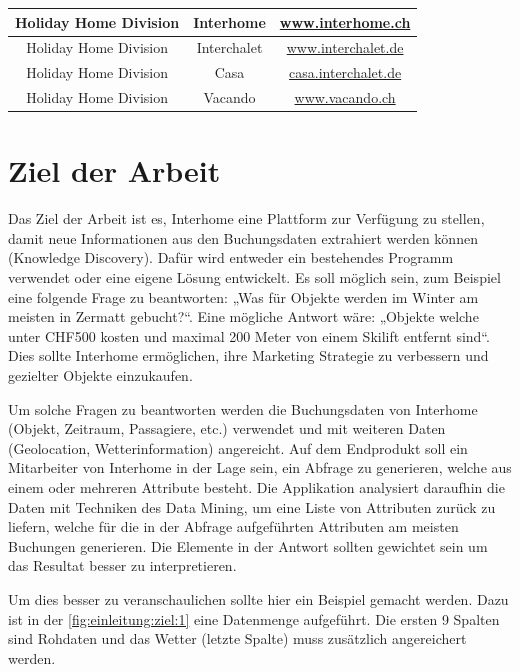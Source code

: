 \begin{table}[h]
\begin{tabular}{ | c | c | c |}
		Holiday Home Division & Interhome & \href{http://www.interhome.ch}{www.interhome.ch} \\ \hline 
		Holiday Home Division & Interchalet & \href{http://www.interchalet.de}{www.interchalet.de} \\ \hline 
		Holiday Home Division & Casa & \href{http://casa.interchalet.de}{casa.interchalet.de} \\ \hline 
		Holiday Home Division & Vacando & \href{http://www.vacando.ch}{www.vacando.ch} \\ \hline 
	\end{tabular}
\end{table}

\section{Ziel der Arbeit}
\label{sec:einleitung:ziel}
Das Ziel der Arbeit ist es, Interhome eine Plattform zur Verfügung zu stellen, damit neue Informationen aus den Buchungsdaten extrahiert werden können (Knowledge Discovery). Dafür wird entweder ein bestehendes Programm verwendet oder eine eigene Lösung entwickelt. Es soll möglich sein, zum Beispiel eine folgende Frage zu beantworten: „Was für Objekte werden im Winter am meisten in Zermatt gebucht?“. Eine mögliche Antwort wäre: „Objekte welche unter CHF500 kosten und maximal 200 Meter von einem Skilift entfernt sind“.
Dies sollte Interhome ermöglichen, ihre Marketing Strategie zu verbessern und gezielter Objekte einzukaufen.

Um solche Fragen zu beantworten werden die Buchungsdaten von Interhome (Objekt, Zeitraum, Passagiere, etc.) verwendet und mit weiteren Daten (Geolocation, Wetterinformation) angereicht. 
Auf dem Endprodukt soll ein Mitarbeiter von Interhome in der Lage sein, ein Abfrage zu generieren, welche aus einem oder mehreren Attribute besteht. Die Applikation analysiert daraufhin die Daten mit Techniken des Data Mining, um eine Liste von Attributen zurück zu liefern, welche für die in der Abfrage aufgeführten Attributen am meisten Buchungen generieren. Die Elemente in der Antwort sollten gewichtet sein um das Resultat besser zu interpretieren.

Um dies besser zu veranschaulichen sollte hier ein Beispiel gemacht werden. Dazu ist in der \cref{fig:einleitung:ziel:1} eine Datenmenge aufgeführt. Die ersten 9 Spalten sind Rohdaten und das Wetter (letzte Spalte) muss zusätzlich angereichert werden.

